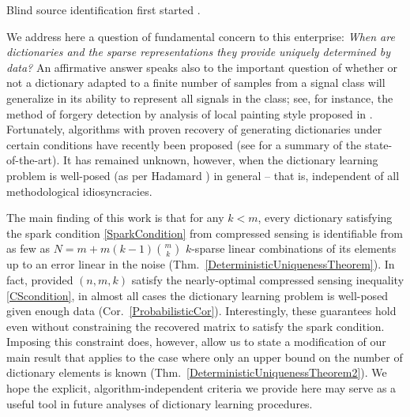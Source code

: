 \documentclass[9pt,twocolumn]{pnas-new}
\begin{document}
Blind source identification first started \cite{sato1975method}.

We address here a question of fundamental concern to this enterprise: \emph{When are dictionaries and the sparse representations they provide uniquely determined by data?} An affirmative answer speaks also to the important question of whether or not a dictionary adapted to a finite number of samples from a signal class will generalize in its ability to represent all signals in the class; see, for instance, the method of forgery detection by analysis of local painting style proposed in \cite{hughes2010, Olshausen10}. Fortunately, algorithms with proven recovery of generating dictionaries under certain conditions have recently been proposed (see \cite[Sec.~I-E]{Sun16} for a summary of the state-of-the-art). It has remained unknown, however, when the dictionary learning problem is well-posed (as per Hadamard \cite{Hadamard1902}) in general -- that is, independent of all methodological idiosyncracies.

The main finding of this work is that for any $k < m$, every dictionary satisfying the spark condition \eqref{SparkCondition} from compressed sensing is identifiable from as few as $N = m + m(k-1){m \choose k}$ $k$-sparse linear combinations of its elements up to an error linear in the noise (Thm.~\ref{DeterministicUniquenessTheorem}). In fact, provided $(n, m, k)$ satisfy the nearly-optimal compressed sensing inequality \eqref{CScondition}, in almost all cases the dictionary learning problem is well-posed given enough data (Cor.~\ref{ProbabilisticCor}). Interestingly, these guarantees hold even without constraining the recovered matrix to satisfy the spark condition. Imposing this constraint does, however, allow us to state a modification of our main result that applies to the case where only an upper bound on the number of dictionary elements is known (Thm.~\ref{DeterministicUniquenessTheorem2}). We hope the explicit, algorithm-independent criteria we provide here may serve as a useful tool in future analyses of dictionary learning procedures.
\end{document}
